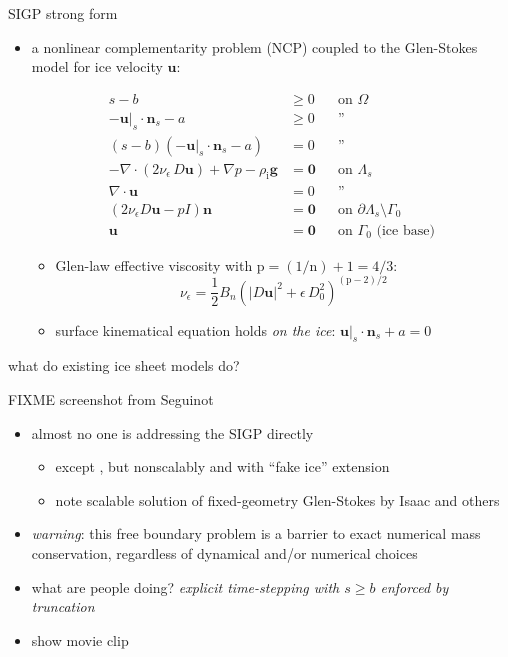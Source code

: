 \documentclass{beamer}
\newcommand{\eps}{\epsilon}
\newcommand{\bn}{\mathbf{n}}
\newcommand{\bu}{\mathbf{u}}
\newcommand{\bzero}{\bm{0}}
\newcommand{\rhoi}{\rho_{\text{i}}}
\newcommand{\pp}{{\text{p}}}
\begin{document}
\begin{frame}{SIGP strong form}

\begin{itemize}
\item \alert{a nonlinear complementarity problem (NCP) coupled to the Glen-Stokes model for ice velocity $\bu$:}

\vspace{-2mm}
\begin{align*}
s - b &\ge 0 && \text{on $\Omega$} \\
- \bu|_s \cdot \bn_s - a &\ge 0 && \text{''} \\
(s - b) (- \bu|_s \cdot \bn_s - a) &= 0 && \text{''} \\
- \nabla \cdot \left(2 \nu_\eps\, D\bu\right) + \nabla p - \rhoi \mathbf{g} &= \bzero && \text{on $\Lambda_s$} \\
\nabla \cdot \bu &= 0 && \text{''} \\
\left(2 \nu_\eps D\bu - pI\right) \bn &= \bzero && \text{on $\partial \Lambda_s \setminus \Gamma_0$} \\
\bu &= \bzero && \text{on $\Gamma_0$ (ice base)}
\end{align*}

    \begin{itemize}
    \item Glen-law effective viscosity with $\text{p}=(1/\text{n})+1=4/3$:
      $$\nu_\eps = \frac{1}{2} B_n \left(|D\bu|^2 + \eps\, D_0^2\right)^{(\pp-2)/2}$$
    \item surface kinematical equation holds \emph{on the ice}: \quad $\bu|_s \cdot \bn_s + a=0$
    \end{itemize}
\end{itemize}
\end{frame}


\begin{frame}{what do existing ice sheet models do?}

FIXME screenshot from Seguinot

\begin{itemize}
\item almost no one is addressing the SIGP directly
    \begin{itemize}
    \item except \cite{WirbelJarosch2020}, but nonscalably and with ``fake ice'' extension
    \item note scalable solution of fixed-geometry Glen-Stokes by Isaac and others \cite{IsaacStadlerGhattas2015}
    \end{itemize}
\item \emph{warning}: this free boundary problem is a barrier to exact numerical mass conservation, regardless of dynamical and/or numerical choices \cite{Bueler2021conservation}
\item what are people doing?  \emph{explicit time-stepping with $s \ge b$ enforced by truncation}
\item \alert{show movie clip}
\end{itemize}
\end{frame}
\end{document}

